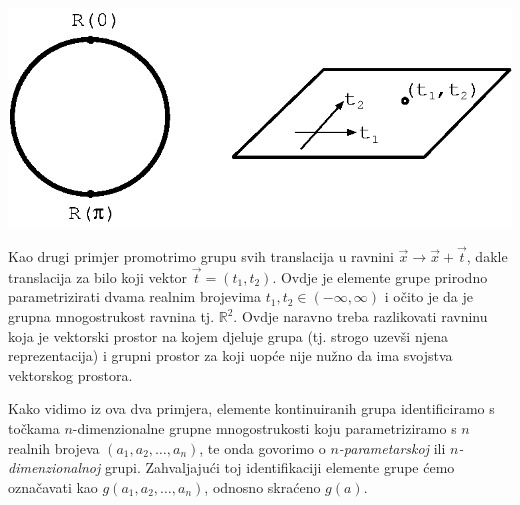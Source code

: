 \centerline{\includegraphics[scale=1.0]{pics/mnogostrukost.eps}}

Kao drugi primjer promotrimo grupu svih translacija u ravnini $\vec{x}\to\vec{x}+\vec{t}$,
dakle translacija za bilo koji vektor $\vec{t}=(t_1, t_2)$.
Ovdje je elemente grupe prirodno parametrizirati dvama
realnim brojevima $t_1, t_2 \in (-\infty, \infty)$ i očito je da je
 grupna mnogostrukost ravnina tj. $\mathbb{R}^2$. Ovdje naravno treba
 razlikovati ravninu koja je vektorski prostor na kojem djeluje grupa
 (tj. strogo uzevši njena reprezentacija) i grupni prostor za koji uopće
 nije nužno da ima svojstva vektorskog prostora.

Kako vidimo iz ova dva primjera, elemente kontinuiranih grupa identificiramo
s točkama $n$-dimenzionalne grupne mnogostrukosti koju
parametriziramo s $n$ realnih brojeva
  $(a_1, a_2, \ldots, a_n)$,
te onda govorimo o \emph{$n$-parametarskoj} ili \emph{$n$-dimenzionalnoj} grupi.
Zahvaljajući toj identifikaciji
elemente grupe ćemo označavati kao $g(a_1, a_2, \ldots, a_n)$, odnosno
skraćeno $g(a)$.

